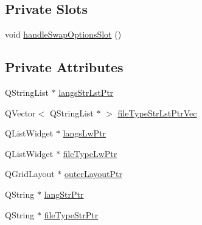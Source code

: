 \subsection*{Private Slots}
\begin{DoxyCompactItemize}
\item 
void \hyperlink{class_new_file_page__1_a8fc47da92a246e9fed5b2e335a5a2b9a}{handle\-Swap\-Options\-Slot} ()
\end{DoxyCompactItemize}
\subsection*{Private Attributes}
\begin{DoxyCompactItemize}
\item 
Q\-String\-List $\ast$ \hyperlink{class_new_file_page__1_acb912634d0accb1d1fc2cb1f5c2dea78}{langs\-Str\-Lst\-Ptr}
\item 
Q\-Vector$<$ Q\-String\-List $\ast$ $>$ \hyperlink{class_new_file_page__1_a5c348b3e762867bc02861bd317eb4964}{file\-Type\-Str\-Lst\-Ptr\-Vec}
\item 
Q\-List\-Widget $\ast$ \hyperlink{class_new_file_page__1_a33c1a3f115a92a04b0f7344cd1b14a57}{langs\-Lw\-Ptr}
\item 
Q\-List\-Widget $\ast$ \hyperlink{class_new_file_page__1_a4886ed76812d01820e2868006b8cde72}{file\-Type\-Lw\-Ptr}
\item 
Q\-Grid\-Layout $\ast$ \hyperlink{class_new_file_page__1_a161e24cf061ed28e5ee5f61e5087a9fc}{outer\-Layout\-Ptr}
\item 
Q\-String $\ast$ \hyperlink{class_new_file_page__1_a28c75fb5624badef97ed17d38f0c598a}{lang\-Str\-Ptr}
\item 
Q\-String $\ast$ \hyperlink{class_new_file_page__1_ac03bd12c5904b2a858137bf7bb93502c}{file\-Type\-Str\-Ptr}
\end{DoxyCompactItemize}


